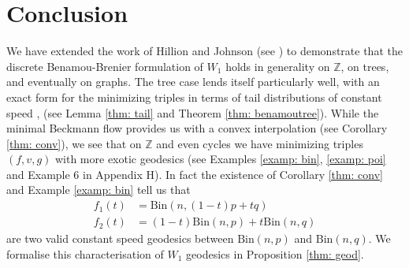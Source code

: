 \documentclass[conference]{IEEEtran}
\newcommand{\bin}{\text{Bin}}
\theoremstyle{ieeestyle}
\begin{document}
\section{Conclusion}
We have extended the work of Hillion and Johnson (see \cite[Lemma 3.6]{hillion2016}) to demonstrate that the discrete Benamou-Brenier formulation of $W_1$ holds in generality on $\mathbb{Z}$, on trees, and eventually on graphs. The tree case lends itself particularly well, with an exact form for the minimizing triples in terms of tail distributions of constant speed , (see Lemma \ref{thm: tail} and Theorem \ref{thm: benamoutree}).  \newline \newline 
While the minimal Beckmann flow provides us with a convex interpolation (see Corollary \ref{thm: conv}), we see that on $\mathbb{Z}$ and even cycles we have minimizing triples $(f,v,g)$ with more exotic geodesics (see Examples \ref{examp: bin}, \ref{examp: poi} and Example 6 in  Appendix H). In fact the existence of Corollary \ref{thm: conv} and Example \ref{examp: bin} tell us that
\begin{align*}
    f_1(t) &= \bin(n,(1-t)p + tq)\\
    f_2(t) &= (1-t)\bin(n,p) + t\bin(n,q)
\end{align*}
are two valid constant speed geodesics between $\bin(n,p)$ and $\bin(n,q)$. We formalise this characterisation of $W_1$ geodesics in Proposition \ref{thm: geod}.
\newpage
\appendix
\end{document}
